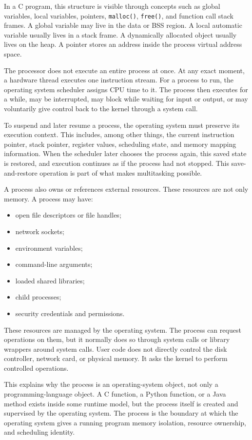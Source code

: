 In a C program, this structure is visible through concepts such as global variables, local variables, pointers, \texttt{malloc()}, \texttt{free()}, and function call stack frames. A global variable may live in the data or BSS region. A local automatic variable usually lives in a stack frame. A dynamically allocated object usually lives on the heap. A pointer stores an address inside the process virtual address space.

The processor does not execute an entire process at once. At any exact moment, a hardware thread executes one instruction stream. For a process to run, the operating system scheduler assigns CPU time to it. The process then executes for a while, may be interrupted, may block while waiting for input or output, or may voluntarily give control back to the kernel through a system call.

To suspend and later resume a process, the operating system must preserve its execution context. This includes, among other things, the current instruction pointer, stack pointer, register values, scheduling state, and memory mapping information. When the scheduler later chooses the process again, this saved state is restored, and execution continues as if the process had not stopped. This save-and-restore operation is part of what makes multitasking possible.

A process also owns or references external resources. These resources are not only memory. A process may have:

\begin{itemize}
    \item open file descriptors or file handles;
    \item network sockets;
    \item environment variables;
    \item command-line arguments;
    \item loaded shared libraries;
    \item child processes;
    \item security credentials and permissions.
\end{itemize}

These resources are managed by the operating system. The process can request operations on them, but it normally does so through system calls or library wrappers around system calls. User code does not directly control the disk controller, network card, or physical memory. It asks the kernel to perform controlled operations.

This explains why the process is an operating-system object, not only a programming-language object. A C function, a Python function, or a Java method exists inside some runtime model, but the process itself is created and supervised by the operating system. The process is the boundary at which the operating system gives a running program memory isolation, resource ownership, and scheduling identity.

